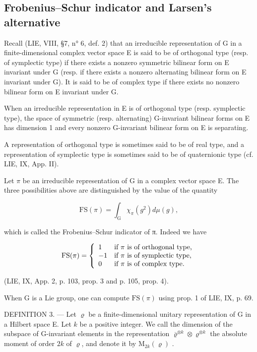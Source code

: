 \subsection{Frobenius--Schur indicator and Larsen's alternative}

Recall (LIE, VIII, §7, n° 6, def. 2) that an irreducible representation of G in a finite-dimensional complex vector space E is said to be of orthogonal type (resp. of symplectic type) if there exists a nonzero symmetric bilinear form on E invariant under G (resp. if there exists a nonzero alternating bilinear form on E invariant under G). It is said to be of complex type if there exists no nonzero bilinear form on E invariant under G.

When an irreducible representation in E is of orthogonal type (resp. symplectic type), the space of symmetric (resp. alternating) G-invariant bilinear forms on E has dimension 1 and every nonzero G-invariant bilinear form on E is separating.

A representation of orthogonal type is sometimes said to be of real type, and a representation of symplectic type is sometimes said to be of quaternionic type (cf. LIE, IX, App. II).

Let \(\pi\) be an irreducible representation of G in a complex vector space E. The three possibilities above are distinguished by the value of the quantity

\[
\mathrm{FS} (\pi) = \int_ {\mathrm{G}} \chi_ {\pi} (g ^ {2}) d \mu (g),
\]

which is called the Frobenius--Schur indicator of π. Indeed we have

\[
\operatorname{FS} (\pi) = \left\{ \begin{array}{l l} 1 & \text{if }\pi\text{ is of orthogonal type,} \\ - 1 & \text{if }\pi\text{ is of symplectic type,} \\ 0 & \text{if }\pi\text{ is of complex type.} \end{array} \right.
\]

(LIE, IX, App. 2, p. 103, prop. 3 and p. 105, prop. 4).

When G is a Lie group, one can compute \(\mathrm{FS}(\pi)\) using prop. 1 of LIE, IX, p. 69.

DEFINITION 3. --- Let \(\varrho\) be a finite-dimensional unitary representation of G in a Hilbert space E. Let \(k\) be a positive integer. We call the dimension of the subspace of G-invariant elements in the representation \(\overline{\varrho}^{\otimes k} \otimes \varrho^{\otimes k}\) the absolute moment of order \(2k\) of \(\varrho\), and denote it by \(\mathrm{M}_{2k}(\varrho)\) .

